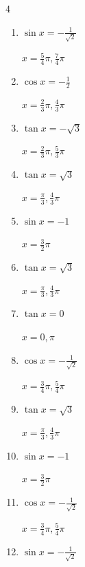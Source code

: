 \begin{multicols}{4}
\begin{enumerate}
  \item $\displaystyle \sin{x}  = -\frac{1}{\sqrt{2}}$

        $\displaystyle x = \frac{5}{4}\pi , \frac{7}{4}\pi$

  \item $\displaystyle \cos{x}  = -\frac{1}{2}$

        $\displaystyle x = \frac{2}{3}\pi , \frac{4}{3}\pi$

  \item $\displaystyle \tan{x}  = -\sqrt{3}$

        $\displaystyle x = \frac{2}{3}\pi , \frac{5}{3}\pi$

  \item $\displaystyle \tan{x}  = \sqrt{3}$

        $\displaystyle x = \frac{\pi}{3} , \frac{4}{3}\pi$

  \item $\displaystyle \sin{x}  = -1$

        $\displaystyle x = \frac{3}{2}\pi$

  \item $\displaystyle \tan{x}  = \sqrt{3}$

        $\displaystyle x = \frac{\pi}{3} , \frac{4}{3}\pi$

\columnbreak %

  \item $\displaystyle \tan{x}  = 0$

        $\displaystyle x = 0 , \pi$

  \item $\displaystyle \cos{x}  = -\frac{1}{\sqrt{2}}$

        $\displaystyle x = \frac{3}{4}\pi , \frac{5}{4}\pi$

  \item $\displaystyle \tan{x}  = \sqrt{3}$

        $\displaystyle x = \frac{\pi}{3} , \frac{4}{3}\pi$

  \item $\displaystyle \sin{x}  = -1$

        $\displaystyle x = \frac{3}{2}\pi$

  \item $\displaystyle \cos{x}  = -\frac{1}{\sqrt{2}}$

        $\displaystyle x = \frac{3}{4}\pi , \frac{5}{4}\pi$

  \item $\displaystyle \sin{x}  = -\frac{1}{\sqrt{2}}$


\end{enumerate}
\end{multicols}
